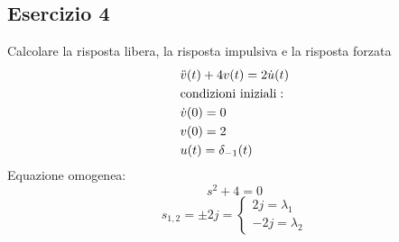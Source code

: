 	\subsection{Esercizio 4}
	Calcolare la risposta libera, la risposta impulsiva e la risposta forzata
		\[
		\begin{split}
		&\ddot{v}(t)+4v(t) = 2\dot{u}(t)\\
		&\mathrm{condizioni \,\, iniziali:}\\
		&\dot{v}(0)=0\\
		&v(0)=2\\
		&u(t)=\delta_{-1}(t)
		\end{split}
		\]
		Equazione omogenea:
		\[s^2 + 4 = 0\]
		\[s_{1,2} = \pm2j =
		\begin{cases}
		2j = \lambda_1\\
		-2j = \lambda_2
		\end{cases}
		\]
		

